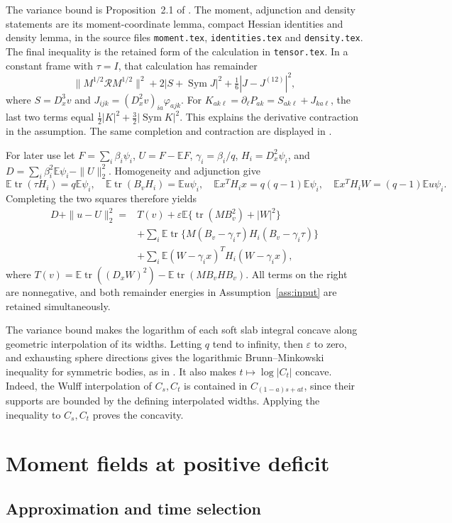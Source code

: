 \documentclass[11pt,reqno]{amsart}
\numberwithin{equation}{section}
\theoremstyle{remark}
\newcommand{\E}{\mathbb E}
\DeclareMathOperator{\tr}{tr}
\DeclareMathOperator{\Sym}{Sym}
\theoremstyle{definition}
\begin{document}
The variance bound is Proposition~2.1 of \cite{OpenAI}. The moment,
adjunction and density statements are its moment-coordinate lemma,
compact Hessian identities and density lemma, in the source files
\texttt{moment.tex}, \texttt{identities.tex} and \texttt{density.tex}.
The final inequality is the retained form of the calculation in
\texttt{tensor.tex}. In a constant frame with $\tau=I$, that calculation
has remainder
\[
 \|M^{1/2}\mathcal RM^{1/2}\|^2+
 2|S+\Sym J|^2+\tfrac16|J-J^{(12)}|^2,
\]
where $S=D_x^3v$ and $J_{ijk}=(D_x^2v)_{ia}\varphi_{ajk}$.
For $K_{ak\ell}=\partial_\ell P_{ak}=S_{ak\ell}+J_{ka\ell}$,
the last two terms equal
$\tfrac12|K|^2+\tfrac32|\Sym K|^2$.
This explains the derivative contraction in the assumption. The same
completion and contraction are displayed in \cite[(3.10)--(3.16)]{LSX}.

For later use let $F=\sum_i\beta_i\psi_i$, $U=F-\E F$,
$\gamma_i=\beta_i/q$, $H_i=D_x^2\psi_i$, and
$D=\sum_i\beta_i^2\E\psi_i-\|U\|_2^2$. Homogeneity and adjunction give
\[
 \E\tr(\tau H_i)=q\E\psi_i,\quad
 \E\tr(B_vH_i)=\E u\psi_i,\quad
 \E x^TH_ix=q(q-1)\E\psi_i,\quad
 \E x^TH_iW=(q-1)\E u\psi_i.
\]
Completing the two squares therefore yields
\begin{align*}
 D+\|u-U\|_2^2={}&T(v)+\varepsilon\E\{\tr(MB_v^2)+|W|^2\}\\
 &+\sum_i\E\tr\{M(B_v-\gamma_i\tau)H_i(B_v-\gamma_i\tau)\}\\
 &+\sum_i\E(W-\gamma_ix)^TH_i(W-\gamma_ix),
\end{align*}
where $T(v)=\E\tr((D_xW)^2)-\E\tr(MB_vHB_v)$.
All terms on the right are nonnegative, and both remainder energies
in Assumption~\ref{ass:input} are retained simultaneously.

The variance bound makes the logarithm of each soft slab integral
concave along geometric interpolation of its widths. Letting $q$ tend
to infinity, then $\varepsilon$ to zero, and exhausting sphere
directions gives the logarithmic Brunn--Minkowski inequality for
symmetric bodies, as in \cite[section 2]{OpenAI}. It also makes
$t\mapsto\log|C_t|$ concave. Indeed, the Wulff interpolation of
$C_s,C_t$ is contained in $C_{(1-a)s+at}$, since their supports are
bounded by the defining interpolated widths. Applying the inequality
to $C_s,C_t$ proves the concavity.
\section{Moment fields at positive deficit}

\subsection{Approximation and time selection}
\end{document}
